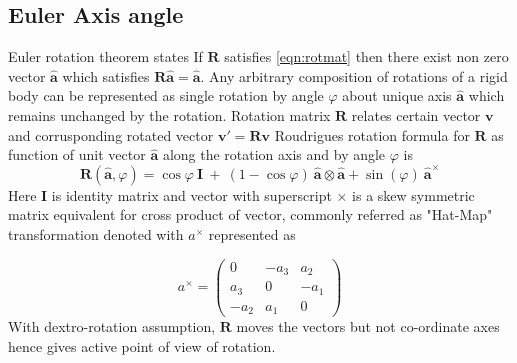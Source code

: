 \subsection{Euler Axis angle}

Euler rotation theorem states If $ \mathbf{R}$ satisfies \autoref{eqn:rotmat} then there exist non zero vector $ \hat{\mathbf{a}}$ which satisfies $ \mathbf{R\hat{a}} =\hat{\mathbf{a}}$. Any arbitrary composition of rotations of a rigid body can be represented as single rotation by angle $ \varphi $ about unique axis $ \hat{\mathbf{a}}$ which remains unchanged by the rotation.\cite{eulerAxis} Rotation matrix $ \mathbf{R}$ relates certain vector $ \mathbf{v}$ and corrusponding rotated vector $ \mathbf{v'} =\mathbf{Rv}$ Roudrigues rotation formula for $ \mathbf{R}$ as function of unit vector $ \hat{\mathbf{a}}$ along the rotation axis and by angle $ \varphi $ is
\begin{equation}
\mathbf{R}(\hat{\mathbf{a}} ,\varphi ) =\cos \varphi \ \mathbf{I} \ +\ ( 1-\cos \varphi ) \ \hat{\mathbf{a}} \otimes \hat{\mathbf{a}} +\sin( \varphi ) \ \hat{\mathbf{a}}^{\times }
\end{equation}
Here $\mathbf{I}$ is identity matrix and vector with superscript $\times$ is a skew symmetric matrix equivalent for cross product of vector, commonly referred as "Hat-Map" transformation denoted with $a^{\times}$ represented as

\begin{equation*}
a^{\times } =\begin{pmatrix}
0 & -a_{3} & a_{2}\\
a_{3} & 0 & -a_{1}\\
-a_{2} & a_{1} & 0
\end{pmatrix}
\end{equation*}
With dextro-rotation assumption, $ \mathbf{R}$ moves the vectors but not co-ordinate axes hence gives active point of view of rotation.

